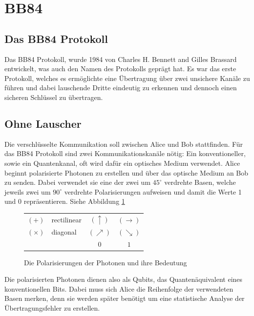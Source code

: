 \section{BB84}
  \subsection{Das BB84 Protokoll}
  Das BB84 Protokoll, wurde 1984 von Charles H. Bennett and Gilles Brassard entwickelt,
  was auch den Namen des Protokolls gepr\"agt hat.
  Es war das erste Protokoll, welches es erm\"oglichte eine \"Ubertragung \"uber zwei unsichere Kan\"ale zu f\"uhren
  und dabei lauschende Dritte eindeutig zu erkennen und dennoch einen sicheren Schl\"ussel zu \"ubertragen.

  \subsection{Ohne Lauscher}
  Die verschl\"usselte Kommunikation soll zwischen Alice und Bob stattfinden.
  F\"ur das BB84 Protokoll sind zwei Kommunikationskan\"ale n\"otig:
  Ein konventioneller, sowie ein Quantenkanal, oft wird daf\"ur ein optisches Medium verwendet.
  Alice beginnt polarisierte Photonen zu erstellen und \"uber das optische Medium an Bob zu senden.
  Dabei verwendet sie eine der zwei um $45^{\circ}$ verdrehte Basen,
  welche jeweils zwei um $90^{\circ}$ verdrehte Polarisierungen aufweisen und damit die Werte 1 und 0 repr\"asentieren. Siehe Abbildung \ref{crypto:poltab}

  \begin{figure}
    \centering
    \begin{tabular}{l l || c c}
      \hline
      $(+)$ & rectilinear & $(\uparrow)$ & $(\rightarrow)$\\
      $(\times)$ & diagonal & $(\nearrow)$ & $(\searrow)$\\
      \hline
      & & $0$ & $1$\\
      \hline
    \end{tabular}
    \caption{Die Polarisierungen der Photonen und ihre Bedeutung\label{crypto:poltab}}
  \end{figure}

  Die polarisierten Photonen dienen also als Qubits, das Quanten\"aquivalent eines konventionellen Bits.
  Dabei muss sich Alice die Reihenfolge der verwendeten Basen merken,
  denn sie werden sp\"ater ben\"otigt um eine statistische Analyse der \"Ubertragungsfehler zu erstellen.


